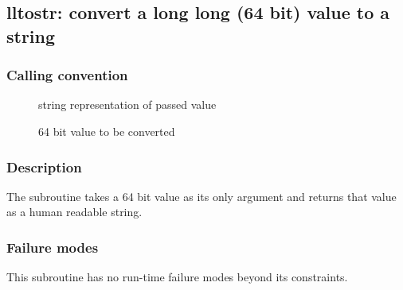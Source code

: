 \clearpage
{}
{}
\label{subr:lltostr}
\subsection*{lltostr: convert a long long (64 bit) value to a string}

\subsubsection*{Calling convention}

\begin{description}
\item[] string representation of passed value
\item[] 64 bit value to be converted
\end{description}

\subsubsection*{Description}

The  subroutine takes a 64 bit value as its only
argument and returns that value as a human readable string.

\subsubsection*{Failure modes}

This subroutine has no run-time failure modes beyond its constraints.
